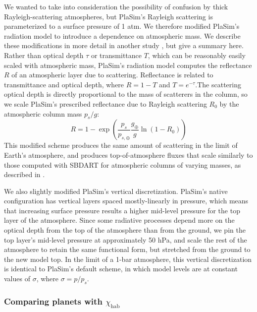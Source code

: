 \documentclass[fleqn,usenatbib]{mnras}
\begin{document}
We wanted to take into consideration the possibility of confusion by thick Rayleigh-scattering atmospheres, but PlaSim's Rayleigh scattering is parameterized to a surface pressure of 1 atm. We therefore modified PlaSim's radiation model to introduce a dependence on atmospheric mass. We describe these modifications in more detail in another study \citep{Paradise2021}, but give a summary here. Rather than optical depth $\tau$ or transmittance $T$, which can be reasonably easily scaled with atmospheric mass, PlaSim's radiation model computes the reflectance $R$ of an atmospheric layer due to scattering. Reflectance is related to transmittance and optical depth, where $R=1-T$ and $T=e^{-\tau}$.The scattering optical depth is directly proportional to the mass of scatterers in the column, so we scale PlaSim's prescribed reflectance due to Rayleigh scattering $R_0$ by the atmospheric column mass $p_s/g$:
\begin{equation}
R = 1-\exp\left(\frac{p_s}{p_{s,\oplus}}\frac{g_\oplus}{g}\ln({1-R_0})\right)
\end{equation}
This modified scheme produces the same amount of scattering in the limit of Earth's atmosphere, and produces top-of-atmosphere fluxes that scale similarly to those computed with SBDART for atmospheric columns of varying masses, as described in \citet{Paradise2021}.

We also slightly modified PlaSim's vertical discretization. PlaSim's native configuration has vertical layers spaced mostly-linearly in pressure, which means that increasing surface pressure results a higher mid-level pressure for the top layer of the atmosphere. Since some radiative processes depend more on the optical depth from the top of the atmosphere than from the ground, we pin the top layer's mid-level pressure at approximately 50 hPa, and scale the rest of the atmosphere to retain the same functional form, but stretched from the ground to the new model top. In the limit of a 1-bar atmosphere, this vertical discretization is identical to PlaSim's default scheme, in which model levels are at constant values of $\sigma$, where $\sigma=p/p_s$.  

\subsubsection{Comparing planets with $\chi_\text{hab}$}
\end{document}
